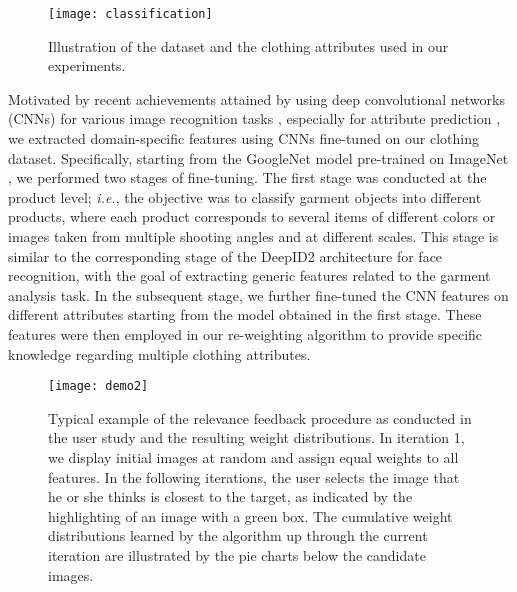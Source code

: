 \documentclass[journal]{IEEEtran}
\begin{document}
\begin{figure}[t]
\centering
\texttt{[image: classification]}
\caption{Illustration of the dataset and the clothing attributes used in our experiments.}
\label{fig::dataset}
\end{figure}


Motivated by recent achievements attained by using deep convolutional networks (CNNs) for various image recognition tasks \cite{girshick2014rich,razavian2014cnn}, especially for attribute prediction \cite{zhang2014panda,escorcia2015relationship,abdulnabi2015multi,shankar2015deep,huang2015part}, we extracted domain-specific features using CNNs fine-tuned on our clothing dataset. Specifically, starting from the GoogleNet \cite{szegedy2015going} model pre-trained on ImageNet \cite{deng2009imagenet}, we performed two stages of fine-tuning. The first stage was conducted at the product level; \textit{i.e.}, the objective was to classify garment objects into different products, where each product corresponds to several items of different colors or images taken from multiple shooting angles and at different scales. This stage is similar to the corresponding stage of the DeepID2 \cite{sun2014deep} architecture for face recognition, with the goal of extracting generic features related to the garment analysis task. In the subsequent stage, we further fine-tuned the CNN features on different attributes starting from the model obtained in the first stage. These features were then employed in our re-weighting algorithm to provide specific knowledge regarding multiple clothing attributes.

\begin{figure*}[!t]
\centering
\texttt{[image: demo2]}
\caption{Typical example of the relevance feedback procedure as conducted in the user study and the resulting weight distributions. In iteration 1, we display initial images at random and assign equal weights to all features. In the following iterations, the user selects the image that he or she thinks is closest to the target, as indicated by the highlighting of an image with a green box. The cumulative weight distributions learned by the algorithm up through the current iteration are illustrated by the pie charts below the candidate images. }
\label{fig::demo}
\end{figure*}
\end{document}
